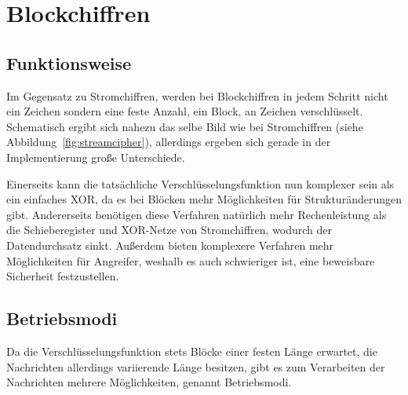 \section{Blockchiffren}
\label{block}

\subsection{Funktionsweise}
Im Gegensatz zu Stromchiffren, werden bei Blockchiffren in jedem Schritt nicht ein Zeichen sondern eine feste Anzahl, ein Block, an Zeichen verschlüsselt.
Schematisch ergibt sich nahezu das selbe Bild wie bei Stromchiffren (siehe Abbildung~\ref{fig:streamcipher}), allerdings ergeben sich gerade in der
Implementierung große Unterschiede.

Einerseits kann die tatsächliche Verschlüsselungsfunktion nun komplexer sein als ein einfaches XOR, da es bei Blöcken mehr Möglichkeiten für
Strukturänderungen gibt. Andererseits benötigen diese Verfahren natürlich mehr Rechenleistung als die Schieberegister und XOR-Netze von Stromchiffren, wodurch
der Datendurchsatz sinkt. Außerdem bieten komplexere Verfahren mehr Möglichkeiten für Angreifer, weshalb es auch schwieriger ist, eine beweisbare Sicherheit festzustellen. 

\subsection{Betriebsmodi}
Da die Verschlüsselungsfunktion stets Blöcke einer festen Länge erwartet, die Nachrichten allerdings variierende Länge besitzen, gibt es zum Verarbeiten der Nachrichten mehrere Möglichkeiten, genannt Betriebsmodi.


